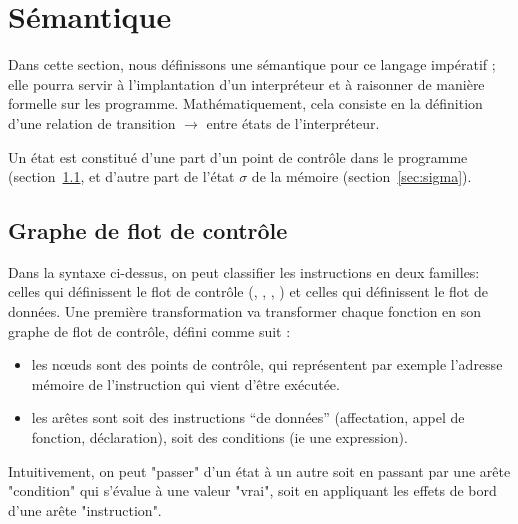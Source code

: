 \section{Sémantique}

Dans cette section, nous définissons une sémantique pour ce langage impératif ;
elle pourra servir à l'implantation d'un interpréteur et à raisonner de manière
formelle sur les programme. Mathématiquement, cela consiste en la définition
d'une relation de transition $\rightarrow$ entre états de l'interpréteur.

Un état est constitué d'une part d'un point de contrôle dans le programme
(section~\ref{sec:cfg}, et d'autre part de l'état $σ$ de la mémoire
(section~\ref{sec:sigma}).

\subsection{Graphe de flot de contrôle}
\label{sec:cfg}

Dans la syntaxe ci-dessus, on peut classifier les instructions en deux familles:
celles qui définissent le flot de contrôle (\npkIf{$\cdot$}{$\cdot$}{$\cdot$},
\npkDoWith{$\cdot$}{$\cdot$}, \npkGoto{$\cdot$}, \npkWhile{$\cdot$}) et celles
qui définissent le flot de données. Une première transformation va transformer
chaque fonction en son graphe de flot de contrôle, défini comme suit :

\begin{itemize}
\item
  les nœuds sont des points de contrôle, qui représentent par exemple
  l'adresse mémoire de l'instruction qui vient d'être exécutée.
\item
  les arêtes sont soit des instructions ``de données'' (affectation,
  appel de fonction, déclaration), soit des conditions (ie une
  expression).
\end{itemize}

\begin{minipage}{0.5\textwidth}

\end{minipage}
\begin{minipage}{0.5\textwidth}

\end{minipage}



Intuitivement, on peut "passer" d'un état à un autre soit en passant par une
arête "condition" qui s'évalue à une valeur "vrai", soit en appliquant les
effets de bord d'une arête "instruction".

